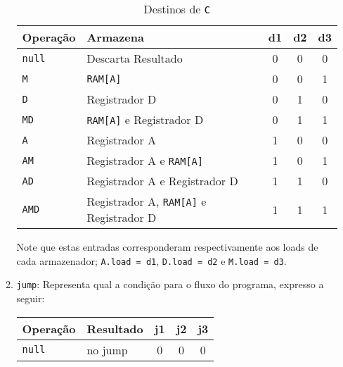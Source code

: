 \documentclass{article}
\begin{document}
\begin{enumerate}[noitemsep]
\begin{enumerate}
\begin{table}[H]
                                    \centering
                                    \begin{tabular}[]{l|l|ccc}\hline
                                        Operação      & Armazena                                       & d1& d2& d3\\\hline
                                        \texttt{null} & Descarta Resultado                             & 0 & 0 & 0\\
                                        \texttt{M}    & \texttt{RAM[A]}                                & 0 & 0 & 1\\
                                        \texttt{D}    & Registrador D                                  & 0 & 1 & 0\\
                                        \texttt{MD}   & \texttt{RAM[A]} e Registrador D                & 0 & 1 & 1\\
                                        \texttt{A}    & Registrador A                                  & 1 & 0 & 0\\
                                        \texttt{AM}   & Registrador A e \texttt{RAM[A]}                & 1 & 0 & 1\\
                                        \texttt{AD}   & Registrador A e Registrador D                  & 1 & 1 & 0\\
                                        \texttt{AMD}  & Registrador A, \texttt{RAM[A]} e Registrador D & 1 & 1 & 1\\\hline
                                    \end{tabular}
                                    \caption{Destinos de \texttt{C}}
                                \end{table}\noindent
                            Note que estas entradas corresponderam respectivamente aos loads de cada armazenador; \texttt{A.load = d1}, \texttt{D.load = d2} e \texttt{M.load = d3}.
                            \item \texttt{jump}: Representa qual a condição para o fluxo do programa, expresso a seguir:
                                \begin{table}[H]
                                    \centering
                                    \begin{tabular}[]{l|l|ccc}\hline
                                        Operação      & Resultado          & j1& j2& j3\\\hline
                                        \texttt{null} & no jump            & 0 & 0 & 0\\

\end{tabular}
\end{table}
\end{enumerate}
\end{enumerate}
\end{document}
